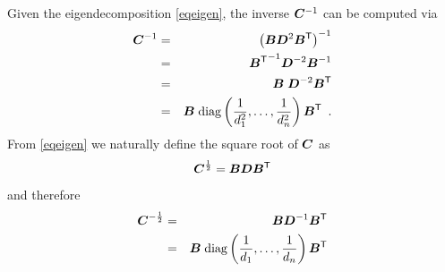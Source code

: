 \documentclass{article} %
\newenvironment{einschub}{%
\begin{small} \begin{quotation}\noindent}{%
  \vspace{0.5ex}\end{quotation}\end{small}%
}
\newcommand{\ma}[1]{\mathchoice{\mbox{\boldmath$\displaystyle#1$}}
  {\mbox{\boldmath$\textstyle#1$}} {\mbox{\boldmath$\scriptstyle#1$}}
  {\mbox{\boldmath$\scriptscriptstyle#1$}}}
\newcommand{\T}{\ensuremath{\mathsf{T}}}
\newcommand{\N}{\ensuremath{n}}
\newcommand{\rklam}[1]{\left({#1}\right)}
\newcommand{\invsqrtC}[1]{{\ma{C}\ifthenelse{%
        \equal{#1}{}}{}{^{(#1)}}}^{-\frac{1}{2}}}
\newcommand{\sqrtC}[1]{{\ma{C}\ifthenelse{%
        \equal{#1}{}}{}{^{(#1)}}}^{\frac{1}{2}}}
\newcommand{\ew}{d^2}
\begin{document}
{%
  Given the eigendecomposition \eqref{eqeigen}, the inverse
  $\ma{C}^{-1}$ can be computed via
  \begin{eqnarray*}
    \ma{C}^{-1} &=& \rklam{\ma{B}\ma{D}^2\ma{B}^\T}^{-1}\\
                &=& {\ma{B}^\T}^{-1} \ma{D}^{-2}\ma{B}^{-1}\\
                &=& {\ma{B}}\;\ma{D}^{-2}\ma{B}^{\T}\\
                &=& \ma{B}\;
          \mathrm{diag}\rklam{\frac{1}{\ew_1},\dots,\frac{1}{\ew_\N}}
          \ma{B}^{\T} \enspace.
  \end{eqnarray*}
From \eqref{eqeigen} we naturally define the square root of 
  $\ma{C}$ as
\begin{equation}
  \label{eq:sqrtC}
  \sqrtC{} = \ma{B}\ma{D}\ma{B}^\T
\end{equation}
and therefore %
\begin{eqnarray*}
   \invsqrtC{} &=&\ma{B}\ma{D}^{-1}\ma{B}^\T \\
         &=& \ma{B}\;\mathrm{diag} 
              \rklam{\frac{1}{d_1},\dots,\frac{1}{d_\N}} \ma{B}^\T
\end{eqnarray*}

}
\end{document}
